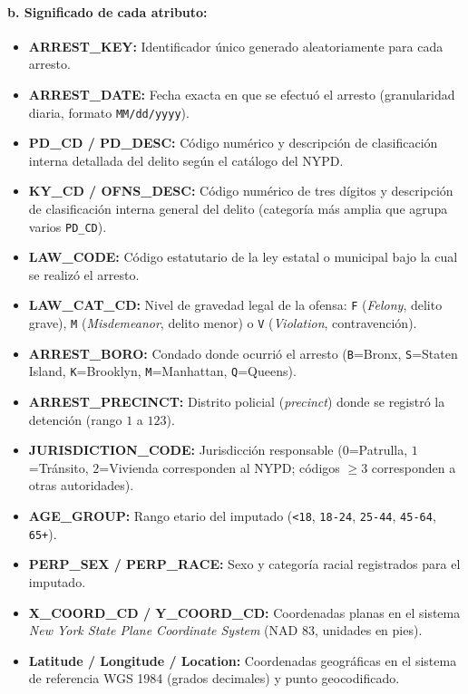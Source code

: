\documentclass[11pt,a4paper]{article}
\begin{document}
\paragraph{b. Significado de cada atributo:}
\begin{itemize}
    \item \textbf{ARREST\_KEY:} Identificador único generado aleatoriamente para cada arresto.
    \item \textbf{ARREST\_DATE:} Fecha exacta en que se efectuó el arresto (granularidad diaria, formato \texttt{MM/dd/yyyy}).
    \item \textbf{PD\_CD / PD\_DESC:} Código numérico y descripción de clasificación interna detallada del delito según el catálogo del NYPD.
    \item \textbf{KY\_CD / OFNS\_DESC:} Código numérico de tres dígitos y descripción de clasificación interna general del delito (categoría más amplia que agrupa varios \texttt{PD\_CD}).
    \item \textbf{LAW\_CODE:} Código estatutario de la ley estatal o municipal bajo la cual se realizó el arresto.
    \item \textbf{LAW\_CAT\_CD:} Nivel de gravedad legal de la ofensa: \texttt{F} (\textit{Felony}, delito grave), \texttt{M} (\textit{Misdemeanor}, delito menor) o \texttt{V} (\textit{Violation}, contravención).
    \item \textbf{ARREST\_BORO:} Condado donde ocurrió el arresto (\texttt{B}=Bronx, \texttt{S}=Staten Island, \texttt{K}=Brooklyn, \texttt{M}=Manhattan, \texttt{Q}=Queens).
    \item \textbf{ARREST\_PRECINCT:} Distrito policial (\textit{precinct}) donde se registró la detención (rango $1$ a $123$).
    \item \textbf{JURISDICTION\_CODE:} Jurisdicción responsable ($0$=Patrulla, $1$=Tránsito, $2$=Vivienda corresponden al NYPD; códigos $\ge 3$ corresponden a otras autoridades).
    \item \textbf{AGE\_GROUP:} Rango etario del imputado (\texttt{<18}, \texttt{18-24}, \texttt{25-44}, \texttt{45-64}, \texttt{65+}).
    \item \textbf{PERP\_SEX / PERP\_RACE:} Sexo y categoría racial registrados para el imputado.
    \item \textbf{X\_COORD\_CD / Y\_COORD\_CD:} Coordenadas planas en el sistema \textit{New York State Plane Coordinate System} (NAD 83, unidades en pies).
    \item \textbf{Latitude / Longitude / Location:} Coordenadas geográficas en el sistema de referencia WGS 1984 (grados decimales) y punto geocodificado.
\end{itemize}
\end{document}
